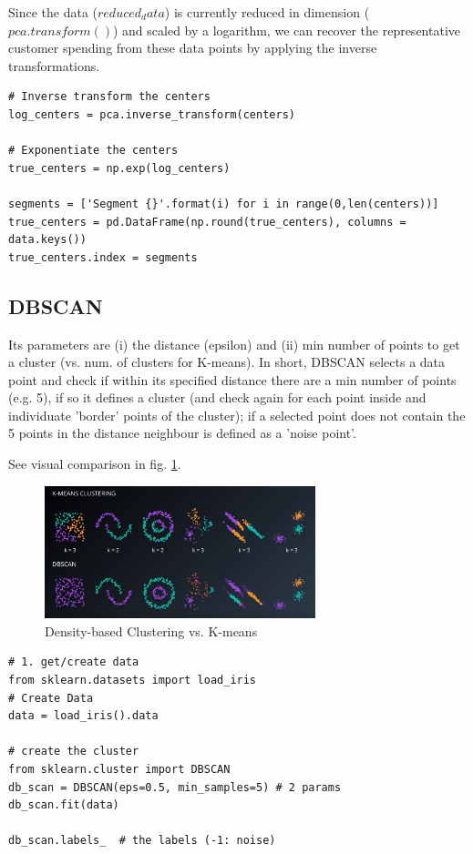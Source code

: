 \documentclass[11pt]{article}
\begin{document}
Since the data ($reduced_data$) is currently reduced in dimension ($pca.transform()$) and scaled by a logarithm, we can recover the representative customer spending from these data points by applying the inverse transformations.	
\begin{lstlisting}
# Inverse transform the centers
log_centers = pca.inverse_transform(centers)

# Exponentiate the centers
true_centers = np.exp(log_centers)

segments = ['Segment {}'.format(i) for i in range(0,len(centers))]
true_centers = pd.DataFrame(np.round(true_centers), columns = data.keys())
true_centers.index = segments
\end{lstlisting}
	
\subsection{DBSCAN}
Its parameters are (i) the distance (epsilon) and (ii) min number of points to get a cluster (vs. num. of clusters for K-means). In short, DBSCAN selects a data point and check if within its specified distance there are a min number of points (e.g. 5), if so it defines a cluster (and check again for each point inside and individuate 'border' points of the cluster); if a selected point does not contain the 5 points in the distance neighbour is defined as a 'noise point'. 

See visual comparison in fig. \ref{_dbscan}.

\begin{figure}[htbp] 
	\centering
	\includegraphics[width=0.7\textwidth]{pics/dbscan}
	\caption{Density-based Clustering vs. K-means} 
	\label{_dbscan}
\end{figure}

\begin{lstlisting}
# 1. get/create data
from sklearn.datasets import load_iris
# Create Data
data = load_iris().data

# create the cluster
from sklearn.cluster import DBSCAN
db_scan = DBSCAN(eps=0.5, min_samples=5) # 2 params
db_scan.fit(data)

db_scan.labels_  # the labels (-1: noise)
\end{lstlisting}
\end{document}
